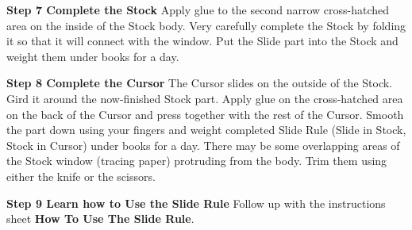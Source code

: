 \documentclass[a4paper,9pt]{article}
\begin{document}
\begin{multicols*}{3}
{  \textbf{Step 7 Complete the Stock} Apply glue to the second narrow cross-hatched area on the inside of the Stock body. Very carefully complete the Stock by folding it so that it will connect with the window. Put the Slide part into the Stock and weight them under books for a day.

  \textbf{Step 8 Complete the Cursor} The Cursor slides on the outside of the Stock. Gird it around the now-finished Stock part. Apply glue on the cross-hatched area on the back of the Cursor and press together with the rest of the Cursor. Smooth the part down using your fingers and weight completed Slide Rule (Slide in Stock, Stock in Cursor) under books for a day. There may be some overlapping areas of the Stock window (tracing paper) protruding from the body. Trim them using either the knife or the scissors.

  \textbf{Step 9 Learn how to Use the Slide Rule} Follow up with the instructions sheet \textbf{How To Use The Slide Rule}.

  }
  \end{multicols*}
  
\end{document}
